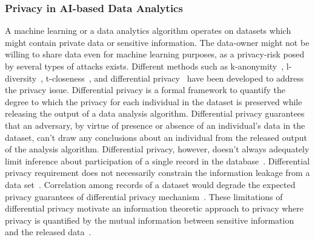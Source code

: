 \documentclass[a4paper,11pt]{article}
\begin{document}
\subsubsection{Privacy in AI-based Data Analytics}
\label{sect:privacy}
A machine learning or a data analytics algorithm operates on datasets which might contain private data or sensitive information. The data-owner might not be willing to share data even for machine learning purposes, as a privacy-risk posed by several types of attacks exists. Different methods such as k-anonymity~\cite{10.1142/S0218488502001648}, l-diversity~\cite{10.1145/1217299.1217302}, t-closeness~\cite{DBLP:conf/icde/LiLV07}, and differential privacy~\cite{10.1561/0400000042} have been developed to address the privacy issue. Differential privacy is a formal framework to quantify the degree to which the privacy for each individual in the dataset is preserved while releasing the output of a data analysis algorithm. Differential privacy guarantees that an adversary, by virtue of presence or absence of an individual's data in the dataset, can't draw any conclusions about an individual from the released output of the analysis algorithm. Differential privacy, however, doesn’t always adequately limit inference about participation of a single record in the database~\cite{10.1145/1989323.1989345}. Differential privacy requirement does not necessarily constrain the information leakage from a data set~\cite{Calmon_privacyagainst}. Correlation among records of a dataset would degrade the expected privacy guarantees of differential privacy mechanism~\cite{DBLP:conf/ndss/LiuMC16}. These limitations of differential privacy motivate an information theoretic approach to privacy where privacy is quantified by the mutual information between sensitive information and the released data~\cite{5288525,Calmon_privacyagainst,6482222,7888175,DBLP:journals/corr/abs-1710-09295}. 
\end{document}
